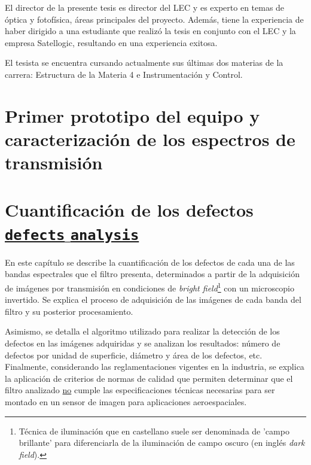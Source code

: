 \documentclass{ctuthesis}
\newcommand\Chapter[2]{\chapter[#1]{#1\\[1ex]\large#2}}
\begin{document}
El director de la presente tesis es director del LEC y es experto en temas de 
óptica y fotofísica, áreas principales del proyecto. Además, tiene la 
experiencia de haber dirigido a una estudiante que realizó la tesis en conjunto 
con el LEC y la empresa Satellogic, resultando en una experiencia exitosa.

El tesista se encuentra cursando actualmente sus últimas dos materias de la 
carrera: 
Estructura de la Materia 4 e Instrumentación y Control.





\chapter{Primer prototipo del equipo y caracterización de los espectros de transmisión}




\Chapter{Cuantificación de los defectos}{\textcolor{MidnightBlue}{\faGithub \href{https://github.com/jrr1984/defects_analysis}{\texttt{defects$\_$analysis}}}}

\hspace{0.5cm}En este capítulo se describe la cuantificación de los defectos de cada una de las bandas espectrales que el filtro presenta, determinados a partir de la adquisición de imágenes por transmisión en condiciones de \textit{bright field}\footnote{Técnica de iluminación que en castellano suele ser denominada de 'campo brillante' para diferenciarla de la iluminación de campo oscuro (en inglés \textit{dark field}).} con un microscopio invertido. Se explica el proceso de adquisición de las imágenes de cada banda del filtro y su posterior procesamiento. 

Asimismo, se detalla el algoritmo utilizado para realizar la detección de los defectos en las imágenes adquiridas y se analizan los resultados: número de defectos por unidad de superficie, diámetro y área de los defectos, etc. Finalmente, considerando las reglamentaciones vigentes en la industria, se explica la aplicación de criterios de normas de calidad que permiten determinar que el filtro analizado \underline{no} cumple las especificaciones técnicas necesarias para ser montado en un sensor de imagen para aplicaciones aeroespaciales.
\end{document}

